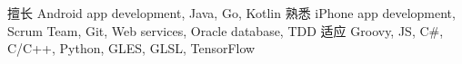 
\begin{cvskills}
	\cvskill
		{擅长}
		{Android app development, Java, Go, Kotlin}
	\cvskill
		{熟悉}
		{iPhone app development, Scrum Team, Git, Web services, Oracle database, TDD}
	\cvskill
		{适应}
		{Groovy, JS, C\#, C/C++, Python, GLES, GLSL, TensorFlow}
\end{cvskills}

